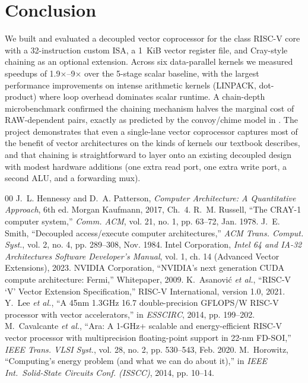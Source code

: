 \documentclass[conference]{IEEEtran}
\begin{document}
\section{Conclusion}
We built and evaluated a decoupled vector coprocessor for the class
RISC-V core with a 32-instruction custom ISA, a 1~KiB vector register
file, and Cray-style chaining as an optional extension. Across six
data-parallel kernels we measured speedups of 1.9$\times$--9$\times$
over the 5-stage scalar baseline, with the largest performance improvements on
intense arithmetic kernels (LINPACK, dot-product) where loop
overhead dominates scalar runtime. A chain-depth microbenchmark
confirmed the chaining mechanism halves the marginal cost of
RAW-dependent pairs, exactly as predicted by the convoy/chime model
in \cite[\S 4.2]{hp_book}. The project demonstrates that even a
single-lane vector coprocessor captures most of the benefit of
vector architectures on the kinds of kernels our textbook describes,
and that chaining is straightforward to layer onto an existing
decoupled design with modest hardware additions (one extra read
port, one extra write port, a second ALU, and a forwarding mux).

\begin{thebibliography}{00}
 J.~L. Hennessy and D.~A. Patterson,
  \textit{Computer Architecture: A Quantitative Approach},
  6th ed. Morgan Kaufmann, 2017, Ch.~4.
 R.~M. Russell, ``The CRAY-1 computer system,''
  \textit{Comm. ACM}, vol. 21, no. 1, pp. 63--72, Jan. 1978.
 J.~E. Smith, ``Decoupled access/execute computer
  architectures,'' \textit{ACM Trans. Comput. Syst.}, vol. 2, no. 4,
  pp. 289--308, Nov. 1984.
 Intel Corporation, \textit{Intel 64 and IA-32
  Architectures Software Developer's Manual}, vol. 1, ch. 14
  (Advanced Vector Extensions), 2023.
 NVIDIA Corporation, ``NVIDIA's next generation
  CUDA compute architecture: Fermi,'' Whitepaper, 2009.
 K.~Asanovi\'c \textit{et al.}, ``RISC-V `V' Vector
  Extension Specification,'' RISC-V International, version 1.0,
  2021.
 Y.~Lee \textit{et al.}, ``A 45nm 1.3GHz 16.7
  double-precision GFLOPS/W RISC-V processor with vector
  accelerators,'' in \textit{ESSCIRC}, 2014, pp. 199--202.
 M.~Cavalcante \textit{et al.}, ``Ara: A 1-GHz+ scalable
  and energy-efficient RISC-V vector processor with multiprecision
  floating-point support in 22-nm FD-SOI,'' \textit{IEEE Trans.
  VLSI Syst.}, vol. 28, no. 2, pp. 530--543, Feb. 2020.
 M.~Horowitz, ``Computing's energy problem
  (and what we can do about it),'' in \textit{IEEE Int.~Solid-State
  Circuits Conf. (ISSCC)}, 2014, pp. 10--14.
\end{thebibliography}
\end{document}
